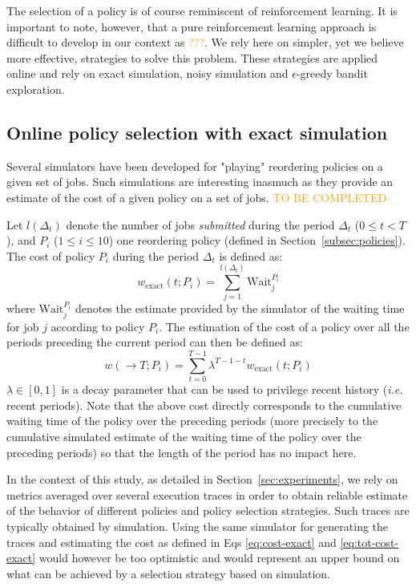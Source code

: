 \documentclass[sigconf]{acmart}
\begin{document}
The selection of a policy is of course reminiscent of reinforcement learning. It is important to note, however, that a pure reinforcement learning approach is difficult to develop in our context as \textcolor{orange}{???}. We rely here on simpler, yet we believe more effective, strategies to solve this problem. These strategies are applied online and rely on exact simulation, noisy simulation and $\epsilon$-greedy bandit exploration.

\subsection{Online policy selection with exact simulation}
\label{sub:feedback}

Several simulators have been developed for "playing" reordering policies on a given set of jobs. Such simulations are interesting inasmuch as they provide an estimate of the cost of a given policy on a set of jobs. \textcolor{orange}{TO BE COMPLETED}

Let $l(\Delta_t)$ denote the number of jobs \textit{submitted} during the period $\Delta_t$ ($0 \le t < T$), and $P_i$ ($1 \le i \le 10$) one reordering policy (defined in Section~\ref{subsec:policies}). The cost of policy $P_i$ during the period $\Delta_t$ is defined as:
%
\begin{equation}
\label{eq:cost-exact}
w_{\mbox{exact}}(t;P_i) = \sum_{j=1}^{l(\Delta_t)} \mbox{Wait}_j^{P_i}
\end{equation}
%
where $\mbox{Wait}_j^{P_i}$ denotes the estimate provided by the simulator of the waiting time for job $j$ according to policy $P_i$. The estimation of the cost of a policy over all the periods preceding the current period can then be defined as:
%
\begin{equation}
\label{eq:tot-cost-exact}
w(\rightarrow T;P_i) = \sum_{t=0}^{T-1} \lambda^{T-1-t} w_{\mbox{exact}}(t;P_i)
\end{equation}
%
$\lambda \in [0,1]$ is a decay parameter that can be used to privilege recent history (\textit{i.e.} recent periods). Note that the above cost directly corresponds to the cumulative waiting time of the policy over the preceding periods (more precisely to the cumulative simulated estimate of the waiting time of the policy over the preceding periods) so that the length of the period has no impact here.

In the context of this study, as detailed in Section~\ref{sec:experiments}, we rely on metrics averaged over several execution traces in order to obtain reliable estimate of the behavior of different policies and policy selection strategies. Such traces are typically obtained by simulation. Using the same simulator for generating the traces and estimating the cost as defined in Eqs \ref{eq:cost-exact} and \ref{eq:tot-cost-exact} would however be too optimistic and would represent an upper bound on what can be achieved by a selection strategy based on simulation.
\end{document}
